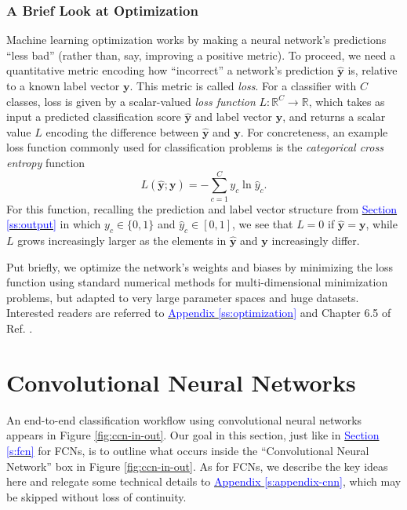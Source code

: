 \documentclass[11pt, a4paper]{article}
\newcommand{\myhref}[2]{\hyperref[#1]{\textcolor{blue}{#2}}}
\renewcommand{\vec}[1]{\bm{#1}}
\newcommand{\y}{\vec{y}}
\begin{document}
\subsubsection{A Brief Look at Optimization} \label{ss:optimization-brief}
Machine learning optimization works by making a neural network's predictions ``less bad'' (rather than, say, improving a positive metric).
To proceed, we need a quantitative metric encoding how ``incorrect'' a network's prediction $ \hat{\y} $ is, relative to a known label vector $ \y $.
This metric is called \textit{loss}.
For a classifier with $ C $ classes, loss is given by a scalar-valued \textit{loss function} $ L : \mathbb{R}^{C} \to \mathbb{R} $, which takes as input a predicted classification score $ \hat{\y} $ and label vector $ \y $, and returns a scalar value $ L $ encoding the difference between $ \hat{\y} $ and $ \y $.
For concreteness, an example loss function commonly used for classification problems is the \textit{categorical cross entropy} function
\begin{equation}
    L(\hat{\y}; \y) = - \sum_{c = 1}^{C} y_{c} \ln \hat{y}_{c}. \label{eq:loss-instance}
\end{equation}
For this function, recalling the prediction and label vector structure from \myhref{ss:output}{Section \ref{ss:output}} in which $ y_{c} \in \{0, 1\} $ and $ \hat{y}_{c} \in [0, 1] $, we see that $ L = 0 $ if $ \hat{\y} = \y $, while $ L $ grows increasingly larger as the elements in $ \hat{\y} $ and $ \y $ increasingly differ.

Put briefly, we optimize the network's weights and biases by minimizing the loss function using standard numerical methods for multi-dimensional minimization problems, but adapted to very large parameter spaces and huge datasets.
Interested readers are referred to \myhref{ss:optimization}{Appendix \ref{ss:optimization}} and Chapter 6.5 of Ref. \cite{goodfellow}.

\section{Convolutional Neural Networks}
An end-to-end classification workflow using convolutional neural networks appears in Figure \ref{fig:ccn-in-out}.
Our goal in this section, just like in \myhref{s:fcn}{Section \ref{s:fcn}} for FCNs, is to outline what occurs inside the ``Convolutional Neural Network'' box in Figure \ref{fig:ccn-in-out}.
As for FCNs, we describe the key ideas here and relegate some technical details to \myhref{s:appendix-cnn}{Appendix \ref{s:appendix-cnn}}, which may be skipped without loss of continuity.  %
\end{document}
